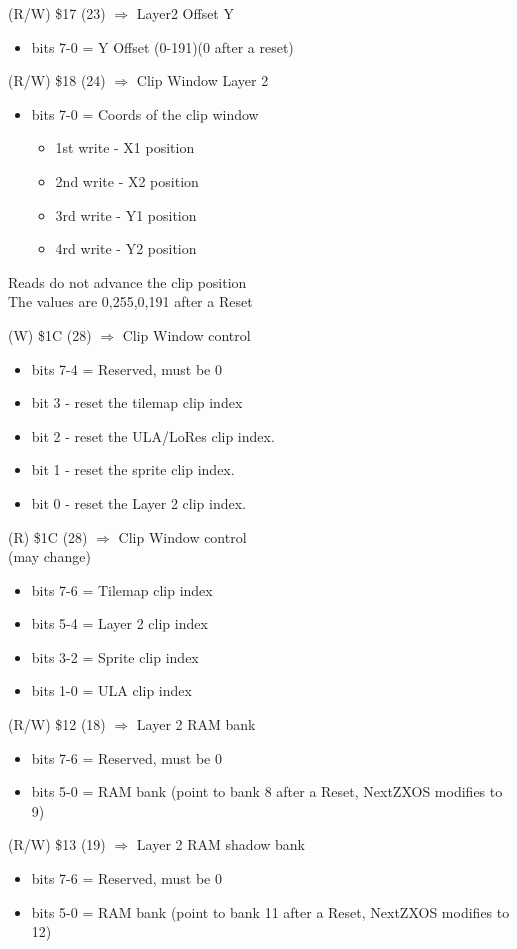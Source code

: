 (R/W) \$17 (23) $\Rightarrow$ Layer2 Offset Y
\begin{itemize}
\item[] bits 7-0 = Y Offset (0-191)(0 after a reset)
\end{itemize}

(R/W) \$18 (24) $\Rightarrow$ Clip Window Layer 2
\begin{itemize}
\item[] bits 7-0 = Coords of the clip window
  \begin{itemize}
  \item[] 1st write - X1 position
  \item[] 2nd write - X2 position
  \item[] 3rd write - Y1 position
  \item[] 4rd write - Y2 position
  \end{itemize}
\end{itemize}
Reads do not advance the clip position\\
The values are 0,255,0,191 after a Reset

(W) \$1C (28) $\Rightarrow$ Clip Window control
\begin{itemize}
\item[] bits 7-4 = Reserved, must be 0
\item[] bit 3 - reset the tilemap clip index
\item[] bit 2 - reset the ULA/LoRes clip index.
\item[] bit 1 - reset the sprite clip index.
\item[] bit 0 - reset the Layer 2 clip index.
\end{itemize}

(R) \$1C (28) $\Rightarrow$ Clip Window control\\
(may change)
\begin{itemize}
\item[] bits 7-6 = Tilemap clip index
\item[] bits 5-4 = Layer 2 clip index
\item[] bits 3-2 = Sprite clip index
\item[] bits 1-0 = ULA clip index
\end{itemize}

(R/W) \$12 (18) $\Rightarrow$ Layer 2 RAM bank
\begin{itemize}
\item[] bits 7-6 = Reserved, must be 0
\item[] bits 5-0 = RAM bank (point to bank 8 after a Reset, NextZXOS
  modifies to 9)
\end{itemize}

(R/W) \$13 (19) $\Rightarrow$ Layer 2 RAM shadow bank
\begin{itemize}
\item[] bits 7-6 = Reserved, must be 0
\item[] bits 5-0 = RAM bank (point to bank 11 after a Reset, NextZXOS
  modifies to 12)
\end{itemize}


